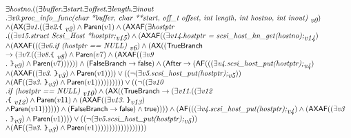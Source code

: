\documentclass{article}
\newcommand{\AX}{\mbox{\sf{AX}}}
\newcommand{\AF}{\mbox{\sf{AF}}}
\newcommand{\mita}[1]{\mbox{\it{{#1}}}}
\newcommand{\msf}[1]{\mbox{\sf{{#1}}}}
\newcommand{\ttlb}{\mbox{\tt \char'173}}
\newcommand{\ttrb}{\mbox{\tt \char'175}}
\begin{document}
\[\begin{array}{l}
\exists \mita{hostno} . ((\exists \mita{buffer} . \exists \mita{start} . \exists \mita{offset} . \exists \mita{length} . \exists \mita{inout}\\ . \exists \mita{v0} . \mita{proc\_info\_func(char *buffer, char **start, off\_t offset, int length,
               int hostno, int inout) }_{\mita{v0}})\\ \wedge (\AX(\exists \mita{v1} . ((\exists \mita{v2} . \mita{{\ttlb}
  }_{\mita{v2}}) \wedge \msf{Paren}(v1) \wedge (\AX\AF(\exists \mita{hostptr}\\ . ((\exists \mita{v15} . \mita{struct Scsi\_Host *hostptr;}_{\mita{v15}}) \wedge (\AX\AF((\exists \mita{v14} . \mita{hostptr = scsi\_host\_hn\_get(hostno);}_{\mita{v14}})\\ \wedge (\AX\AF(((\exists \mita{v6} . \mita{if (hostptr == NULL) }_{\mita{v6}}) \wedge (\AX((\msf{TrueBranch}\\ \rightarrow (\exists \mita{v7} . ((\exists \mita{v8} . \mita{{\ttlb}
  }_{\mita{v8}}) \wedge \msf{Paren}(v7) \wedge (\AX\AF((\exists \mita{v9}\\ . \mita{
{\ttrb}}_{\mita{v9}}) \wedge \msf{Paren}(v7)))))) \wedge (\msf{FalseBranch} \rightarrow \msf{false}) \wedge (\msf{After} \rightarrow (\AF(((\exists \mita{v4} . \mita{scsi\_host\_put(hostptr);}_{\mita{v4}})\\ \wedge (\AX\AF((\exists \mita{v3} . \mita{
{\ttrb}}_{\mita{v3}}) \wedge \msf{Paren}(v1)))) \vee ((\neg (\exists \mita{v5} . \mita{scsi\_host\_put(hostptr);}_{\mita{v5}}))\\ \wedge (\AF((\exists \mita{v3} . \mita{
{\ttrb}}_{\mita{v3}}) \wedge \msf{Paren}(v1)))))))))) \vee ((\neg ((\exists \mita{v10}\\ . \mita{if (hostptr == NULL) }_{\mita{v10}}) \wedge (\AX((\msf{TrueBranch} \rightarrow (\exists \mita{v11} . ((\exists \mita{v12}\\ . \mita{{\ttlb}
  }_{\mita{v12}}) \wedge \msf{Paren}(v11) \wedge (\AX\AF((\exists \mita{v13} . \mita{
{\ttrb}}_{\mita{v13}})\\ \wedge \msf{Paren}(v11)))))) \wedge (\msf{FalseBranch} \rightarrow \msf{false}) \wedge \msf{true})))) \wedge (\AF(((\exists \mita{v4} . \mita{scsi\_host\_put(hostptr);}_{\mita{v4}}) \wedge (\AX\AF((\exists \mita{v3}\\ . \mita{
{\ttrb}}_{\mita{v3}}) \wedge \msf{Paren}(v1)))) \vee ((\neg (\exists \mita{v5} . \mita{scsi\_host\_put(hostptr);}_{\mita{v5}}))\\ \wedge (\AF((\exists \mita{v3} . \mita{
{\ttrb}}_{\mita{v3}}) \wedge \msf{Paren}(v1))))))))))))))))))
\end{array}\]
\end{document}
